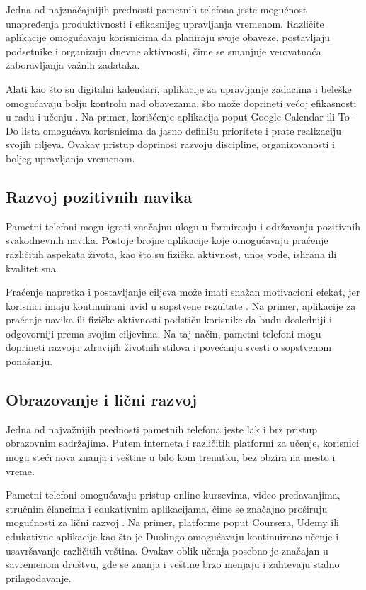 \documentclass{article}
\begin{document}
Jedna od najznačajnijih prednosti pametnih telefona jeste mogućnost unapređenja produktivnosti i efikasnijeg upravljanja vremenom. Različite aplikacije omogućavaju korisnicima da planiraju svoje obaveze, postavljaju podsetnike i organizuju dnevne aktivnosti, čime se smanjuje verovatnoća zaboravljanja važnih zadataka.

Alati kao što su digitalni kalendari, aplikacije za upravljanje zadacima i beleške omogućavaju bolju kontrolu nad obavezama, što može doprineti većoj efikasnosti u radu i učenju \cite{Duke2013}. Na primer, korišćenje aplikacija poput Google Calendar ili To-Do lista omogućava korisnicima da jasno definišu prioritete i prate realizaciju svojih ciljeva. Ovakav pristup doprinosi razvoju discipline, organizovanosti i boljeg upravljanja vremenom.

\subsection{Razvoj pozitivnih navika}

Pametni telefoni mogu igrati značajnu ulogu u formiranju i održavanju pozitivnih svakodnevnih navika. Postoje brojne aplikacije koje omogućavaju praćenje različitih aspekata života, kao što su fizička aktivnost, unos vode, ishrana ili kvalitet sna.

Praćenje napretka i postavljanje ciljeva može imati snažan motivacioni efekat, jer korisnici imaju kontinuirani uvid u sopstvene rezultate \cite{Fogg2009}. Na primer, aplikacije za praćenje navika ili fizičke aktivnosti podstiču korisnike da budu dosledniji i odgovorniji prema svojim ciljevima. Na taj način, pametni telefoni mogu doprineti razvoju zdravijih životnih stilova i povećanju svesti o sopstvenom ponašanju.


\subsection{Obrazovanje i lični razvoj}

Jedna od najvažnijih prednosti pametnih telefona jeste lak i brz pristup obrazovnim sadržajima. Putem interneta i različitih platformi za učenje, korisnici mogu steći nova znanja i veštine u bilo kom trenutku, bez obzira na mesto i vreme.

Pametni telefoni omogućavaju pristup online kursevima, video predavanjima, stručnim člancima i edukativnim aplikacijama, čime se značajno proširuju mogućnosti za lični razvoj \cite{Traxler2007}. Na primer, platforme poput Coursera, Udemy ili edukativne aplikacije kao što je Duolingo omogućavaju kontinuirano učenje i usavršavanje različitih veština. Ovakav oblik učenja posebno je značajan u savremenom društvu, gde se znanja i veštine brzo menjaju i zahtevaju stalno prilagođavanje.
\end{document}
